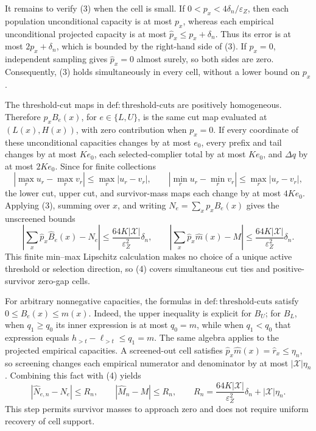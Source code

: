 It remains to verify (3) when the cell is small.  If
\(0<p_x<4\delta_n/\varepsilon_Z\), then each population unconditional
capacity is at most \(p_x\), whereas each empirical unconditional
projected capacity is at most \(\widehat p_x\le p_x+\delta_n\).
Thus its error is at most \(2p_x+\delta_n\), which is bounded by the
right-hand side of (3).  If \(p_x=0\), independent sampling gives
\(\widehat p_x=0\) almost surely, so both sides are zero.  Consequently,
(3) holds simultaneously in every cell, without a lower bound on
\(p_x\).

The threshold-cut maps in \(\mathrm{def{:}threshold\text{-}cuts}\) are
positively homogeneous.  Therefore \(p_xB_e(x)\), for \(e\in\{L,U\}\),
is the same cut map evaluated at \((L(x),H(x))\), with zero contribution
when \(p_x=0\).  If every coordinate of these unconditional capacities
changes by at most \(e_0\), every prefix and tail changes by at most
\(Ke_0\), each selected-complier total by at most \(Ke_0\), and
\(\Delta q\) by at most \(2Ke_0\).  Since for finite collections
\[
|\max_r u_r-\max_r v_r|\le\max_r|u_r-v_r|,
\qquad
|\min_r u_r-\min_r v_r|\le\max_r|u_r-v_r|,
\]
the lower cut, upper cut, and survivor-mass maps each change by at most
\(4Ke_0\).  Applying (3), summing over \(x\), and writing
\(N_e=\sum_xp_xB_e(x)\) gives the unscreened bounds
\[
\left|\sum_x\widehat p_x\widehat B_e(x)-N_e\right|
\le\frac{64K|\mathcal X|}{\varepsilon_Z^2}\delta_n,
\qquad
\left|\sum_x\widehat p_x\widehat m(x)-M\right|
\le\frac{64K|\mathcal X|}{\varepsilon_Z^2}\delta_n.
\tag{4}
\]
This finite min--max Lipschitz calculation makes no choice of a unique
active threshold or selection direction, so (4) covers simultaneous cut
ties and positive-survivor zero-gap cells.

For arbitrary nonnegative capacities, the formulas in
\(\mathrm{def{:}threshold\text{-}cuts}\) satisfy
\(0\le B_e(x)\le m(x)\).  Indeed, the upper inequality is explicit for
\(B_U\); for \(B_L\), when \(q_1\ge q_0\) its inner expression is at
most \(q_0=m\), while when \(q_1<q_0\) that expression equals
\(h_{>t}-\ell_{>t}\le q_1=m\).  The same algebra applies to the
projected empirical capacities.  A screened-out cell satisfies
\(\widehat p_x\widehat m(x)=\widehat r_x\le\eta_n\), so screening changes
each empirical numerator and denominator by at most
\(|\mathcal X|\eta_n\).  Combining this fact with (4) yields
\[
|\widehat N_{e,n}-N_e|\le R_n,
\qquad
|\widehat M_n-M|\le R_n,
\qquad
R_n=\frac{64K|\mathcal X|}{\varepsilon_Z^2}\delta_n
     +|\mathcal X|\eta_n.
\tag{5}
\]
This step permits survivor masses to approach zero and does not require
uniform recovery of cell support.

